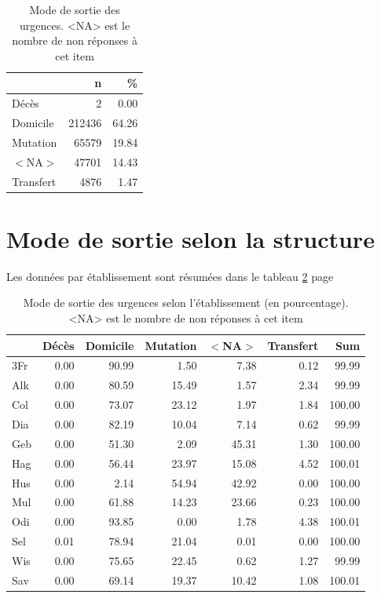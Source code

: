 \documentclass[12pt,english,french,twoside]{report}\usepackage[]{graphicx}\usepackage[]{color}
\begin{document}
\begin{table}[ht]
\centering
\begin{tabular}{|l|r|r|}
  \hline
 & n & \% \\ 
  \hline
Décès & 2 & 0.00 \\ 
  Domicile & 212436 & 64.26 \\ 
  Mutation & 65579 & 19.84 \\ 
  $<$NA$>$ & 47701 & 14.43 \\ 
  Transfert & 4876 & 1.47 \\ 
   \hline
\end{tabular}
\caption[Mode de sortie des urgences]{Mode de sortie des urgences. <NA> est le nombre de non réponses à cet item} 
\label{tab.sortie}
\end{table}



\section{Mode de sortie selon la structure}

Les données par établissement sont résumées dans le tableau \ref{tab.sortie_etab} page \pageref{tab.sortie_etab}

\begin{table}[ht]
\centering
\begin{tabular}{|l|r|r|r|r|r|r|}
  \hline
 & Décès & Domicile & Mutation & $<$NA$>$ & Transfert & Sum \\ 
  \hline
3Fr & 0.00 & 90.99 & 1.50 & 7.38 & 0.12 & 99.99 \\ 
  Alk & 0.00 & 80.59 & 15.49 & 1.57 & 2.34 & 99.99 \\ 
  Col & 0.00 & 73.07 & 23.12 & 1.97 & 1.84 & 100.00 \\ 
  Dia & 0.00 & 82.19 & 10.04 & 7.14 & 0.62 & 99.99 \\ 
  Geb & 0.00 & 51.30 & 2.09 & 45.31 & 1.30 & 100.00 \\ 
  Hag & 0.00 & 56.44 & 23.97 & 15.08 & 4.52 & 100.01 \\ 
  Hus & 0.00 & 2.14 & 54.94 & 42.92 & 0.00 & 100.00 \\ 
  Mul & 0.00 & 61.88 & 14.23 & 23.66 & 0.23 & 100.00 \\ 
  Odi & 0.00 & 93.85 & 0.00 & 1.78 & 4.38 & 100.01 \\ 
  Sel & 0.01 & 78.94 & 21.04 & 0.01 & 0.00 & 100.00 \\ 
  Wis & 0.00 & 75.65 & 22.45 & 0.62 & 1.27 & 99.99 \\ 
  Sav & 0.00 & 69.14 & 19.37 & 10.42 & 1.08 & 100.01 \\ 
   \hline
\end{tabular}
\caption[Mode de sortie selon l'établissement]{Mode de sortie des urgences selon l'établissement (en pourcentage). <NA> est le nombre de non réponses à cet item} 
\label{tab.sortie_etab}
\end{table}
\end{document}
